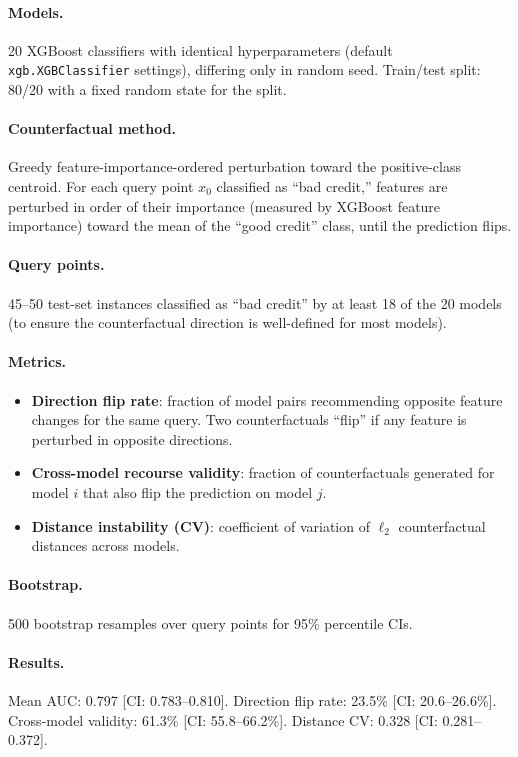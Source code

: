 \documentclass[11pt,a4paper]{article}
\begin{document}
\paragraph{Models.}
20 XGBoost classifiers with identical hyperparameters (default \texttt{xgb.XGBClassifier}
settings), differing only in random seed.  Train/test split: 80/20 with a fixed
random state for the split.

\paragraph{Counterfactual method.}
Greedy feature-importance-ordered perturbation toward the positive-class centroid.
For each query point $x_0$ classified as ``bad credit,'' features are perturbed
in order of their importance (measured by XGBoost feature importance) toward the
mean of the ``good credit'' class, until the prediction flips.

\paragraph{Query points.}
45--50 test-set instances classified as ``bad credit'' by at least 18 of the
20 models (to ensure the counterfactual direction is well-defined for most
models).

\paragraph{Metrics.}
\begin{itemize}[nosep]
  \item \textbf{Direction flip rate}: fraction of model pairs recommending
    opposite feature changes for the same query.  Two counterfactuals ``flip''
    if any feature is perturbed in opposite directions.
  \item \textbf{Cross-model recourse validity}: fraction of counterfactuals
    generated for model $i$ that also flip the prediction on model $j$.
  \item \textbf{Distance instability (CV)}: coefficient of variation of
    $\ell_2$ counterfactual distances across models.
\end{itemize}

\paragraph{Bootstrap.}
500 bootstrap resamples over query points for 95\% percentile CIs.

\paragraph{Results.}
Mean AUC: 0.797 [CI: 0.783--0.810].  Direction flip rate: 23.5\%
[CI: 20.6--26.6\%].  Cross-model validity: 61.3\% [CI: 55.8--66.2\%].
Distance CV: 0.328 [CI: 0.281--0.372].
\end{document}
